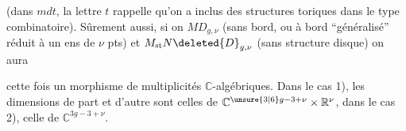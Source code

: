 
(dans $mdt$, la lettre $t$ rappelle qu'on a inclus
des structures toriques dans le type
combinatoire). Sûrement aussi, si on
  $MD_{g,\nu}$ (sans bord, ou à bord
``généralisé'' réduit à un ens de $\nu$ pts)
et $M_{\mathrm{st}}N\deleted{D}_{g,\nu}$ (sans structure disque) on
aura


cette fois un morphisme de 
multiplicités  $\mathbb C$-algébriques.
Dans le cas 1), les dimensions  de
part et d'autre sont celles de $\mathbb C^{\unsure{3|6}g-3+\nu}\times\mathbb R^\nu$,
 dans le cas 2),  celle de $\mathbb C^{3g-3+\nu}$.

